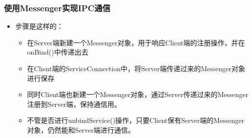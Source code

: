 \documentclass[9pt, b5paper]{article}
\begin{document}
\subsubsection{使用Messenger实现IPC通信}
\label{sec-1-6-2}
\begin{itemize}
\item 步骤是这样的：
\begin{itemize}
\item 在Server端新建一个Messenger对象，用于响应Client端的注册操作，并在onBind()中传递出去
\item 在Client端的ServiceConnection中，将Server端传递过来的Messenger对象进行保存
\item 同时Client端也新建一个Messenger对象，通过Server传递过来的Messenger注册到Server端，保持通信用。
\item 不管是否进行unbindService()操作，只要Client保有Server端的Messenger对象，仍然能和Server端进行通信。
\end{itemize}
\end{itemize}
\end{document}
